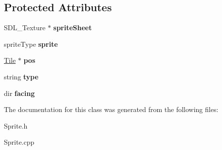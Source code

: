 \subsection*{Protected Attributes}
\begin{DoxyCompactItemize}
\item 
S\+D\+L\+\_\+\+Texture $\ast$ {\bfseries sprite\+Sheet}\hypertarget{class_sprite_aec7102885a3ca3fdd5124f8677135013}{}\label{class_sprite_aec7102885a3ca3fdd5124f8677135013}

\item 
sprite\+Type {\bfseries sprite}\hypertarget{class_sprite_afbd06de3c7cace1c741bbb609abfa119}{}\label{class_sprite_afbd06de3c7cace1c741bbb609abfa119}

\item 
\hyperlink{class_tile}{Tile} $\ast$ {\bfseries pos}\hypertarget{class_sprite_a0c9a0f1d80abccd68b0e24ebd3172809}{}\label{class_sprite_a0c9a0f1d80abccd68b0e24ebd3172809}

\item 
string {\bfseries type}\hypertarget{class_sprite_af4ab6cfa8155326b6d8af31f943514f2}{}\label{class_sprite_af4ab6cfa8155326b6d8af31f943514f2}

\item 
dir {\bfseries facing}\hypertarget{class_sprite_a40357a4e61f454decf1970929e9d2d0c}{}\label{class_sprite_a40357a4e61f454decf1970929e9d2d0c}

\end{DoxyCompactItemize}


The documentation for this class was generated from the following files\+:\begin{DoxyCompactItemize}
\item 
Sprite.\+h\item 
Sprite.\+cpp\end{DoxyCompactItemize}
